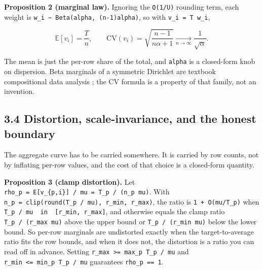 \textbf{Proposition 2 (marginal law).} Ignoring the \texttt{O(1/\allowbreak{}U)}
rounding term, each weight is
\texttt{w\_\allowbreak{}i\ \textasciitilde{}\ Beta(alpha,\ (n-1)alpha)}, so with
\texttt{v\_\allowbreak{}i\ =\ T\ w\_\allowbreak{}i},

\[\mathbb{E}[v_i] = \frac{T}{n}, \qquad \mathrm{CV}(v_i) = \sqrt{\frac{n-1}{n\alpha+1}} \xrightarrow[n\to\infty]{} \frac{1}{\sqrt{\alpha}}.\]

The mean is just the per-row share of the total, and \texttt{alpha} is a
closed-form knob on dispersion. Beta marginals of a symmetric Dirichlet
are textbook compositional data analysis
\cite{aitchison1986compositional}; the CV formula is a property of that
family, not an invention.

\hypertarget{distortion-scale-invariance-and-the-honest-boundary}{%
\subsection{3.4 Distortion, scale-invariance, and the honest
boundary}\label{distortion-scale-invariance-and-the-honest-boundary}}

The aggregate curve has to be carried somewhere. It is carried by row
counts, not by inflating per-row values, and the cost of that choice is
a closed-form quantity.

\textbf{Proposition 3 (clamp distortion).} Let
\texttt{rho\_\allowbreak{}p\ =\ E{[}v\_\allowbreak{}\{p,i\}{]}\ /\allowbreak{}\ mu\ =\ T\_\allowbreak{}p\ /\allowbreak{}\ (n\_\allowbreak{}p\ mu)}.
With \texttt{n\_\allowbreak{}p\ =\ clip(round(T\_\allowbreak{}p\ /\allowbreak{}\ mu),\ r\_\allowbreak{}min,\ r\_\allowbreak{}max)}, the
ratio is \texttt{1\ +\ O(mu/\allowbreak{}T\_\allowbreak{}p)} when
\texttt{T\_\allowbreak{}p\ /\allowbreak{}\ mu\ \ in\ \ {[}r\_\allowbreak{}min,\ r\_\allowbreak{}max{]}}, and otherwise
equals the clamp ratio \texttt{T\_\allowbreak{}p\ /\allowbreak{}\ (r\_\allowbreak{}max\ mu)} above the upper
bound or \texttt{T\_\allowbreak{}p\ /\allowbreak{}\ (r\_\allowbreak{}min\ mu)} below the lower bound. So
per-row marginals are undistorted exactly when the target-to-average
ratio fits the row bounds, and when it does not, the distortion is a
ratio you can read off in advance. Setting
\texttt{r\_\allowbreak{}max\ \textgreater{}=\ max\_\allowbreak{}p\ T\_\allowbreak{}p\ /\allowbreak{}\ mu} and
\texttt{r\_\allowbreak{}min\ \textless{}=\ min\_\allowbreak{}p\ T\_\allowbreak{}p\ /\allowbreak{}\ mu} guarantees
\texttt{rho\_\allowbreak{}p\ ==\ 1}.

